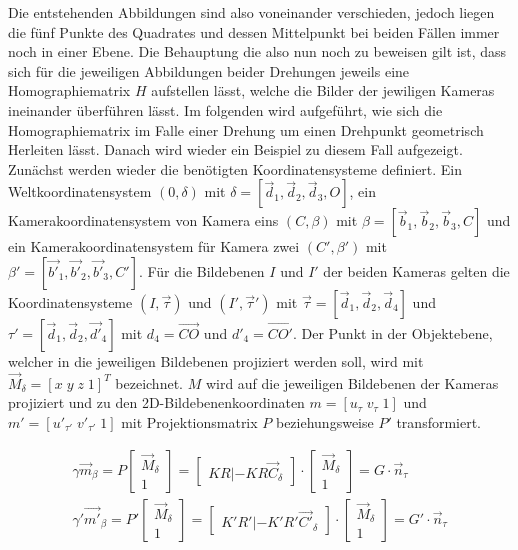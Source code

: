 Die entstehenden Abbildungen sind also voneinander verschieden, jedoch liegen die fünf Punkte des Quadrates und dessen Mittelpunkt bei beiden Fällen immer noch in einer Ebene. Die Behauptung die also nun noch zu beweisen gilt ist, dass sich für die jeweiligen Abbildungen beider Drehungen jeweils eine Homographiematrix $H$ aufstellen lässt, welche die Bilder der jewiligen Kameras ineinander überführen lässt. Im folgenden wird aufgeführt, wie sich die Homographiematrix im Falle einer Drehung um einen Drehpunkt geometrisch Herleiten lässt. Danach wird wieder ein Beispiel zu diesem Fall aufgezeigt.  Zunächst werden wieder die benötigten Koordinatensysteme definiert. Ein Weltkoordinatensystem $(0,\delta)$ mit $\delta = [\vec{d}_1,\vec{d}_2,\vec{d}_3,O]$, ein Kamerakoordinatensystem von Kamera eins $(C,\beta)$ mit $\beta = [\vec{b}_1,\vec{b}_2,\vec{b}_3,C]$ und ein Kamerakoordinatensystem für Kamera zwei $(C',\beta')$ mit $\beta' = [\vec{b'}_1,\vec{b'}_2,\vec{b'}_3,C']$. Für die Bildebenen $I$ und $I'$ der beiden Kameras gelten die Koordinatensysteme $(I,\vec{\tau})$ und $(I',\vec{\tau}')$ mit $\vec{\tau} = [\vec{d}_1,\vec{d}_2,\vec{d}_4]$ und $\tau' = [\vec{d}_1,\vec{d}_2,\vec{d'}_4]$ mit $d_4 = \vec{CO}$ und $d'_4 = \vec{CO'}$. Der Punkt in der Objektebene, welcher in die jeweiligen Bildebenen projiziert werden soll, wird mit $\vec{M}_\delta = [x\; y\; z\; 1]^T$ bezeichnet. $M$ wird auf die jeweiligen Bildebenen der Kameras projiziert und zu den 2D-Bildebenenkoordinaten $m = [u_\tau \; v_\tau \; 1]$ und $m' =  [u'_{\tau'} \; v'_{\tau'} \; 1]$ mit Projektionsmatrix $P$ beziehungsweise $P'$ transformiert.

\begin{gather}
	\gamma \vec{m}_\beta = P \begin{bmatrix}\vec{M}_\delta\\1\end{bmatrix} = \begin{bmatrix}
	KR|-KR\vec{C}_\delta\end{bmatrix} \cdot \begin{bmatrix}\vec{M}_\delta\\1\end{bmatrix} = G \cdot \vec{n}_\tau\\
	\gamma' \vec{m'}_\beta = P' \begin{bmatrix}\vec{M}_\delta\\1\end{bmatrix} = \begin{bmatrix}
	K'R'|-K'R'\vec{C'}_\delta\end{bmatrix} \cdot \begin{bmatrix}\vec{M}_\delta\\1\end{bmatrix} = G' \cdot \vec{n}_\tau
\end{gather}

